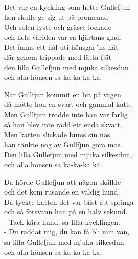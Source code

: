 \vspace{10pt}
Det var en kyckling som hette Gullefjun \\
hon skulle ge sig ut på promenad\\
Och solen lyste och gräset lockade\\
och hela världen var så hjärtans glad. \\
Det fanns ett hål uti hönsgår´ns nät\\
där genom trippade med lätta fjät \\
den lilla Gullefjun med mjuka silkesdun\\
och alla hönsen sa ka-ka-ka ka.\par
\vspace{10pt}
När Gullfjun kommit en bit på vägen\\
då mötte hon en svart och gammal katt.\\
Men Gullfjun trodde inte han var farlig\\
så han blev inte rädd ett enda skvatt.\\
Men katten slickade bums sin nos,\\
han tänkte nog av Gullfjun göra mos.\\
Den lilla Gullefjun med mjuka silkesdun,\\
och alla hönsen sa ka-ka-ka ka.\par
\vspace{10pt}
Då hörde Gullefjun att någon skällde\\
och det kom rusande en väldig hund.\\
Då tyckte katten det var bäst att springa\\
och så försvann han på en halv sekund.\\
- Tack kära hund, sa lilla kycklingen.\\
- Du räddat mig, du kan få bli min vän,\\
sa lilla Gullefjun med mjuka silkesdun\\
och alla hönsen sa ka-ka-ka ka.
